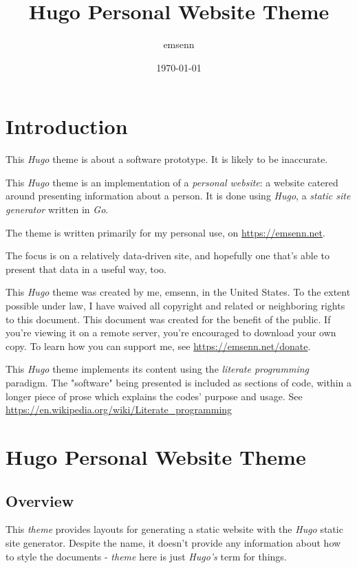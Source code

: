 \documentclass[11pt]{article}
\author{emsenn}
\date{\today}
\title{Hugo Personal Website Theme}
\begin{document}
\maketitle
\setcounter{tocdepth}{3}
\tableofcontents
\section*{Introduction}
\label{sec:orgd2e524f}
This \emph{Hugo} theme is about a software prototype. It is likely to be inaccurate.

This \emph{Hugo} theme is an implementation of a \emph{personal website}: a website
catered around presenting information about a person. It is done using
\emph{Hugo}, a \emph{static site generator} written in \emph{Go}.

The theme is written primarily for my personal use, on
\href{https://emsenn.net}{https://emsenn.net}.

The focus is on a relatively data-driven site, and hopefully one
that's able to present that data in a useful way, too.

This \emph{Hugo} theme was created by me, emsenn, in the United States. To the extent possible under law, I have waived all copyright and related or neighboring rights to this document. This document was created for the benefit of the public. If you're viewing it on a remote server, you're encouraged to download your own copy. To learn how you can support me, see \href{https://emsenn.net/donate}{https://emsenn.net/donate}.

This \emph{Hugo} theme implements its content using the \emph{literate programming} paradigm. The "software" being presented is included as sections of code, within a longer piece of prose which explains the codes' purpose and usage. See \href{https://en.wikipedia.org/wiki/Literate\_programming}{https://en.wikipedia.org/wiki/Literate\_programming}
\section*{Hugo Personal Website Theme}
\label{sec:orgd44d13a}
\startcontents[level-1]
\subsection*{Overview}
\label{sec:orga484c8a}
This \emph{theme} provides layouts for generating a static website with the
\emph{Hugo} static site generator. Despite the name, it doesn't provide any
information about how to style the documents - \emph{theme} here is just
\emph{Hugo's} term for things.
\end{document}
